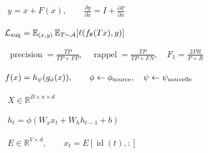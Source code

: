 \documentclass[border=4pt,multi=preview]{standalone}
\begin{document}
\begin{preview}\color{ink}\fontsize{24}{30}\selectfont
$\displaystyle \begin{gathered}y=x+F(x),\qquad\frac{\partial y}{\partial x}=I+\frac{\partial F}{\partial x}\end{gathered}$
\end{preview}
\begin{preview}\color{ink}\fontsize{24}{30}\selectfont
$\displaystyle \begin{gathered}\mathcal L_{\rm aug}=\mathbb E_{(x,y)}\,\mathbb E_{T\sim\mathcal A}\!\left[\ell(f_\theta(Tx),y)\right]\end{gathered}$
\end{preview}
\begin{preview}\color{ink}\fontsize{24}{30}\selectfont
$\displaystyle \begin{gathered}\operatorname{precision}=\frac{TP}{TP+FP},\quad\operatorname{rappel}=\frac{TP}{TP+FN},\quad F_1=\frac{2PR}{P+R}\end{gathered}$
\end{preview}
\begin{preview}\color{ink}\fontsize{24}{30}\selectfont
$\displaystyle \begin{gathered}f(x)=h_{\psi}(g_{\phi}(x)),\qquad\phi\leftarrow\phi_{\rm source},\quad\psi\leftarrow\psi_{\rm nouvelle}\end{gathered}$
\end{preview}
\begin{preview}\color{ink}\fontsize{24}{30}\selectfont
$\displaystyle \begin{gathered}X\in\mathbb R^{B\times n\times d}\end{gathered}$
\end{preview}
\begin{preview}\color{ink}\fontsize{24}{30}\selectfont
$\displaystyle \begin{gathered}h_t=\phi(W_xx_t+W_hh_{t-1}+b)\end{gathered}$
\end{preview}
\begin{preview}\color{ink}\fontsize{24}{30}\selectfont
$\displaystyle \begin{gathered}E\in\mathbb R^{V\times d},\qquad x_t=E[\operatorname{id}(t),:]\end{gathered}$
\end{preview}
\end{document}
